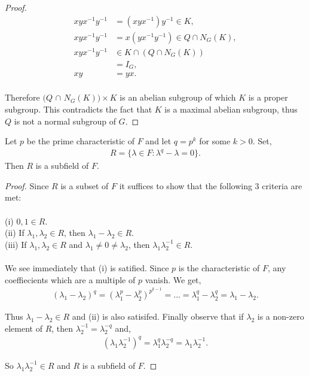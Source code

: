 \begin{proof}
\begin{align*} xyx^{-1}y^{-1} &=  (xyx^{-1})y^{-1} \in K, \tag{since $K \vartriangleleft N_G(K)$} \\
xyx^{-1}y^{-1} &= x(yx^{-1}y^{-1}) \in Q \cap N_G(K), \tag{since $Q \cap N_G(K) \vartriangleleft N_G(K)$} \\
xyx^{-1}y^{-1} &\in K \cap ( Q \cap N_G(K)) \\
&= I_G, \tag{since gcd$(|Q \cap N_G(K)|,|K|) = 1$} \\
xy &= yx. \\
\end{align*}

Therefore $(Q$ $\cap$ $N_G(K)) \times K$ is an abelian subgroup of which $K$ is a proper subgroup. This contradicts the fact that $K$ is a maximal abelian subgroup, thus $Q$ is not a normal subgroup of $G$.

\end{proof}

\begin{lemma}
    \label{subfield} Let $p$ be the prime characteristic of $F$ and let $q= p^k$ for some $k>0$. Set,
\begin{align}\label{RRR} R = \{ \lambda \in F : \lambda^q -\lambda = 0 \}.
\end{align}
Then $R$ is a subfield of $F$.
\end{lemma}

\begin{proof} Since $R$ is a subset of $F$ it suffices to show that the following 3 criteria are met: \\
\\
(i) $0, 1 \in R$. \\
(ii) If $\lambda_1, \lambda_2 \in R$, then $\lambda_1 - \lambda_2 \in R$. \\
(iii) If $\lambda_1, \lambda_2 \in R$ and $\lambda_1 \neq 0 \neq \lambda_2$, then $\lambda_1 \lambda^{-1}_2 \in R$. \\
\\
We see immediately that (i) is satified. Since $p$ is the characteristic of $F$, any coeffiecients which are a multiple of $p$ vanish. We get,
\begin{align*} (\lambda_1 - \lambda_2)^q = (\lambda^p_1 - \lambda^p_2)^{p^{k-1}} = ... = \lambda^q_1 - \lambda^q_2 = \lambda_1 - \lambda_2.
\end{align*}

Thus $\lambda_1 - \lambda_2 \in R$ and (ii) is also satisifed. Finally observe that if $\lambda_2$ is a non-zero element of $R$, then $\lambda^{-1}_2 = \lambda^{-q}_2$ and,
\begin{align*} (\lambda_1 \lambda^{-1}_2)^q = \lambda^q_1 \lambda^{-q}_2 = \lambda_1 \lambda^{-1}_2.
\end{align*}

So $\lambda_1 \lambda^{-1}_2 \in R$ and $R$ is a subfield of $F$.

\end{proof}

